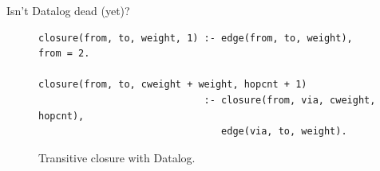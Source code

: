 \documentclass[USenglish,aspectratio=169]{beamer} %
\begin{document}
\begin{frame}[fragile]{Isn't Datalog dead (yet)?}
    \begin{figure}[h]
        \centering
        \begin{lstlisting}[keepspaces]
closure(from, to, weight, 1) :- edge(from, to, weight), from = 2.

closure(from, to, cweight + weight, hopcnt + 1)
                             :- closure(from, via, cweight, hopcnt),
                                edge(via, to, weight).\end{lstlisting}
        \caption{Transitive closure with Datalog.}\label{code:trans-closure-datalog}
    \end{figure}
\end{frame}

\begin{frame}
    \begin{itemize}
    \end{itemize}
\end{frame}
\end{document}
